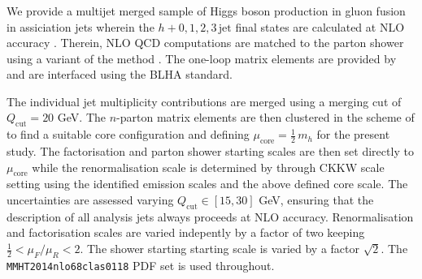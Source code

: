 \subsubsection{\Sherpa \MEPSatNLO}
\label{sec:hjetscomp:tools:mc:sherpa}

We provide a multijet merged sample of Higgs boson production in 
gluon fusion in assiciation jets wherein the $h+0,1,2,3\,\text{jet}$ 
final states are calculated at NLO accuracy \cite{Gleisberg:2008ta,
  Hoeche:2012yf,Gehrmann:2012yg,Hoeche:2014lxa}. Therein, NLO QCD 
computations are matched to the parton shower using a variant of the 
\MCatNLO method \cite{Hoeche:2011fd,Hoeche:2012ft,Hoche:2012wh}.
The one-loop matrix elements are provided by \GoSam \cite{Cullen:2011ac,
  Cullen:2013saa,Greiner:2015jha} and are interfaced using the BLHA 
\cite{Alioli:2013nda} standard.

The individual jet multiplicity contributions are merged using a merging 
cut of $Q_\text{cut}=20$ GeV. The $n$-parton matrix elements are then 
clustered in the scheme of \cite{Hoeche:2009rj,Hoeche:2012yf,Gehrmann:2012yg} 
to find a suitable core configuration and defining $\mu_\text{core}
=\tfrac{1}{2}\,m_h$ for the present study. The factorisation 
and parton shower starting scales are then set directly to 
$\mu_\text{core}$ while the renormalisation scale is determined by 
through CKKW scale setting using the identified emission scales and 
the above defined core scale.
The uncertainties are assessed varying $Q_\text{cut}\in[15,30]$ GeV, 
ensuring that the description of all analysis jets always proceeds 
at NLO accuracy. Renormalisation and factorisation scales are varied 
indepently by a factor of two keeping $\tfrac{1}{2} < \mu_F/\mu_R < 2$. 
The shower starting starting scale is varied by a factor $\sqrt{2}$. 
The \texttt{MMHT2014nlo68clas0118} PDF set \cite{Harland-Lang:2014zoa} 
is used throughout.

